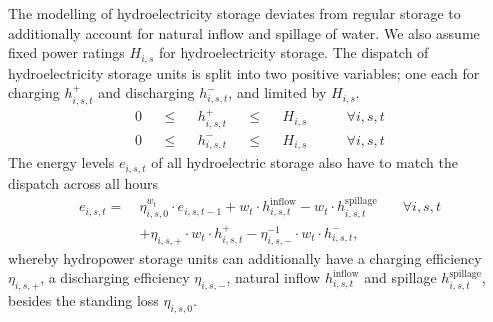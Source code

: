 The modelling of hydroelectricity storage deviates from regular storage to
additionally account for natural inflow and spillage of water. We also assume
fixed power ratings $H_{i,s}$ for hydroelectricity storage. The dispatch of
hydroelectricity storage units is split into two positive variables; one each
for charging $h_{i,s,t}^+$ and discharging $h_{i,s,t}^-$, and limited by
$H_{i,s}$.
\begin{align}
  0 &  & \leq &  & h_{i,s,t}^+ &  & \leq &  & H_{i,s} & \qquad\forall i, s, t \label{eq:sto1} \\
  0 &  & \leq &  & h_{i,s,t}^- &  & \leq &  & H_{i,s} & \qquad\forall i, s, t \label{eq:sto2}
\end{align}
The energy levels $e_{i,s,t}$ of all hydroelectric storage also have to match
the dispatch across all hours
\begin{align}
  e_{i,s,t} =\: & \eta_{i,s,0}^{w_t} \cdot e_{i,s,t-1} + w_t \cdot h_{i,s,t}^\text{inflow} - w_t \cdot h_{i,s,t}^\text{spillage} & \quad\forall i, s, t \nonumber \\
                & + \eta_{i,s,+} \cdot w_t \cdot h_{i,s,t}^+ - \eta_{i,s,-}^{-1} \cdot w_t \cdot h_{i,s,t}^-, \label{eq:stoe}
\end{align}
whereby hydropower storage units can additionally have a charging efficiency
$\eta_{i,s,+}$, a discharging efficiency $\eta_{i,s,-}$, natural inflow
$h_{i,s,t}^\text{inflow}$ and spillage $h_{i,s,t}^\text{spillage}$, besides the
standing loss $\eta_{i,s,0}$.


